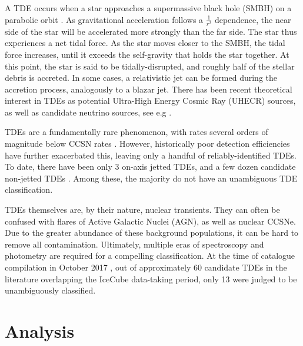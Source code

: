 \documentclass{PoS}
\begin{document}
A TDE occurs when a star approaches a supermassive black hole (SMBH) on a parabolic orbit \cite{Komossa:2015qya}. As gravitational acceleration follows a $\frac{1}{r^{2}}$ dependence, the near side of the star will be accelerated more strongly than the far side. The star thus experiences a net tidal force. As the star moves closer to the SMBH, the tidal force increases, until it exceeds the self-gravity that holds the star together. At this point, the star is said to be tidally-disrupted, and roughly half of the stellar debris is accreted. In some cases, a relativistic jet can be formed during the accretion process, analogously to a blazar jet. There has been recent theoretical interest in TDEs as potential Ultra-High Energy Cosmic Ray (UHECR) sources, as well as candidate neutrino sources, see e.g \cite{Lunardini:2016xwi, Biehl:2017hnb}.

TDEs are a fundamentally rare phenomenon, with rates several orders of magnitude below CCSN rates \cite{vanVelzen:2017qum}. However, historically poor detection efficiencies have further exacerbated this, leaving only a handful of reliably-identified TDEs. To date, there have been only 3 on-axis jetted TDEs, and a few dozen candidate non-jetted TDEs \cite{Komossa:2015qya, Auchettl:2016qfa}. Among these, the majority do not have an unambiguous TDE classification. 

TDEs themselves are, by their nature, nuclear transients. They can often be confused with flares of Active Galactic Nuclei (AGN), as well as nuclear CCSNe. Due to the greater abundance of these background populations, it can be hard to remove all contamination. Ultimately, multiple eras of spectroscopy and photometry are required for a compelling classification. At the time of catalogue compilation in October 2017 \cite{Auchettl:2016qfa}, out of approximately 60 candidate TDEs in the literature overlapping the IceCube data-taking period, only 13 were judged to be unambiguously classified.

\section{Analysis}
\end{document}
